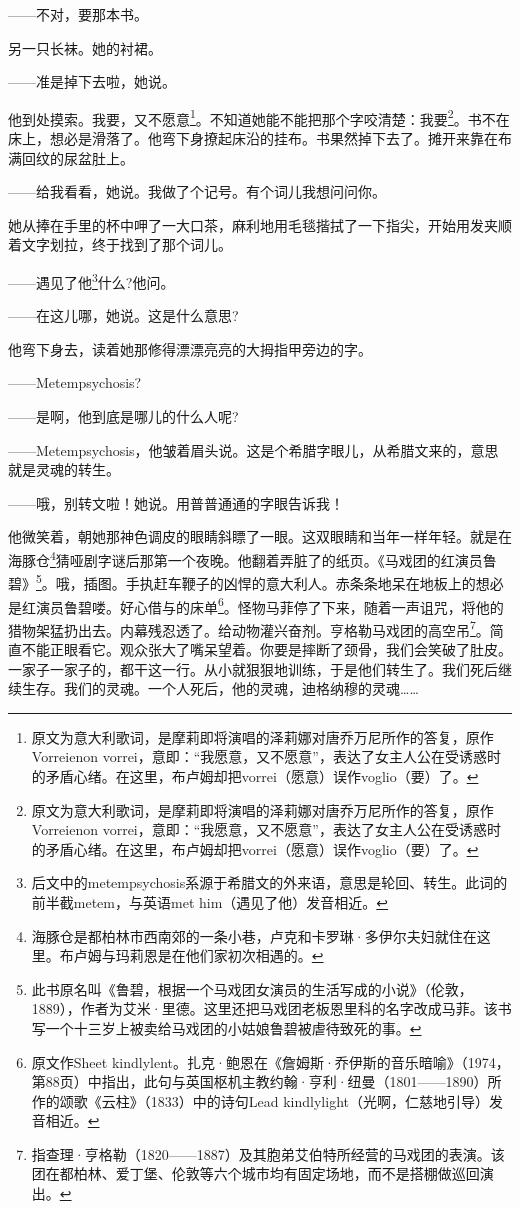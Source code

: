 \par ——不对，要那本书。
\par 另一只长袜。她的衬裙。
\par ——准是掉下去啦，她说。
\par 他到处摸索。我要，又不愿意\footnote{原文为意大利歌词，是摩莉即将演唱的泽莉娜对唐乔万尼所作的答复，原作Vorreienon vorrei，意即：“我愿意，又不愿意”，表达了女主人公在受诱惑时的矛盾心绪。在这里，布卢姆却把vorrei（愿意）误作voglio（要）了。}。不知道她能不能把那个字咬清楚：我要\footnote{原文为意大利歌词，是摩莉即将演唱的泽莉娜对唐乔万尼所作的答复，原作Vorreienon vorrei，意即：“我愿意，又不愿意”，表达了女主人公在受诱惑时的矛盾心绪。在这里，布卢姆却把vorrei（愿意）误作voglio（要）了。}。书不在床上，想必是滑落了。他弯下身撩起床沿的挂布。书果然掉下去了。摊开来靠在布满回纹的尿盆肚上。
\par ——给我看看，她说。我做了个记号。有个词儿我想问问你。
\par 她从捧在手里的杯中呷了一大口茶，麻利地用毛毯揩拭了一下指尖，开始用发夹顺着文字划拉，终于找到了那个词儿。
\par ——遇见了他\footnote{后文中的metempsychosis系源于希腊文的外来语，意思是轮回、转生。此词的前半截metem，与英语met him（遇见了他）发音相近。}什么?他问。
\par ——在这儿哪，她说。这是什么意思?
\par 他弯下身去，读着她那修得漂漂亮亮的大拇指甲旁边的字。
\par ——Metempsychosis?
\par ——是啊，他到底是哪儿的什么人呢?
\par ——Metempsychosis，他皱着眉头说。这是个希腊字眼儿，从希腊文来的，意思就是灵魂的转生。
\par ——哦，别转文啦！她说。用普普通通的字眼告诉我！
\par 他微笑着，朝她那神色调皮的眼睛斜瞟了一眼。这双眼睛和当年一样年轻。就是在海豚仓\footnote{海豚仓是都柏林市西南郊的一条小巷，卢克和卡罗琳·多伊尔夫妇就住在这里。布卢姆与玛莉恩是在他们家初次相遇的。}猜哑剧字谜后那第一个夜晚。他翻着弄脏了的纸页。《马戏团的红演员鲁碧》\footnote{此书原名叫《鲁碧，根据一个马戏团女演员的生活写成的小说》（伦敦，1889），作者为艾米·里德。这里还把马戏团老板恩里科的名字改成马菲。该书写一个十三岁上被卖给马戏团的小姑娘鲁碧被虐待致死的事。}。哦，插图。手执赶车鞭子的凶悍的意大利人。赤条条地呆在地板上的想必是红演员鲁碧喽。好心借与的床单\footnote{原文作Sheet kindlylent。扎克·鲍恩在《詹姆斯·乔伊斯的音乐暗喻》（1974，第88页）中指出，此句与英国枢机主教约翰·亨利·纽曼（1801——1890）所作的颂歌《云柱》（1833）中的诗句Lead kindlylight（光啊，仁慈地引导）发音相近。}。怪物马菲停了下来，随着一声诅咒，将他的猎物架猛扔出去。内幕残忍透了。给动物灌兴奋剂。亨格勒马戏团的高空吊\footnote{指查理·亨格勒（1820——1887）及其胞弟艾伯特所经营的马戏团的表演。该团在都柏林、爱丁堡、伦敦等六个城市均有固定场地，而不是搭棚做巡回演出。}。简直不能正眼看它。观众张大了嘴呆望着。你要是摔断了颈骨，我们会笑破了肚皮。一家子一家子的，都干这一行。从小就狠狠地训练，于是他们转生了。我们死后继续生存。我们的灵魂。一个人死后，他的灵魂，迪格纳穆的灵魂……
